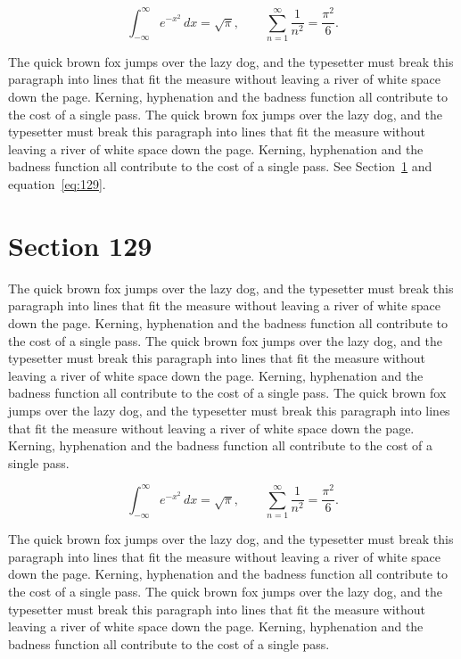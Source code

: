 \documentclass{article}
\begin{document}
\begin{equation}\label{eq:128}
\int_{-\infty}^{\infty} e^{-x^{2}}\,dx = \sqrt{\pi}, \qquad
\sum_{n=1}^{\infty} \frac{1}{n^{2}} = \frac{\pi^{2}}{6}.
\end{equation}

The quick brown fox jumps over the lazy dog, and the typesetter must break this paragraph into lines that fit the measure without leaving a river of white space down the page. Kerning, hyphenation and the badness function all contribute to the cost of a single pass. The quick brown fox jumps over the lazy dog, and the typesetter must break this paragraph into lines that fit the measure without leaving a river of white space down the page. Kerning, hyphenation and the badness function all contribute to the cost of a single pass. 
See Section~\ref{sec:129} and equation~\eqref{eq:129}.
\section{Section 129}
\label{sec:129}
The quick brown fox jumps over the lazy dog, and the typesetter must break this paragraph into lines that fit the measure without leaving a river of white space down the page. Kerning, hyphenation and the badness function all contribute to the cost of a single pass. The quick brown fox jumps over the lazy dog, and the typesetter must break this paragraph into lines that fit the measure without leaving a river of white space down the page. Kerning, hyphenation and the badness function all contribute to the cost of a single pass. The quick brown fox jumps over the lazy dog, and the typesetter must break this paragraph into lines that fit the measure without leaving a river of white space down the page. Kerning, hyphenation and the badness function all contribute to the cost of a single pass. 

\begin{equation}\label{eq:129}
\int_{-\infty}^{\infty} e^{-x^{2}}\,dx = \sqrt{\pi}, \qquad
\sum_{n=1}^{\infty} \frac{1}{n^{2}} = \frac{\pi^{2}}{6}.
\end{equation}

The quick brown fox jumps over the lazy dog, and the typesetter must break this paragraph into lines that fit the measure without leaving a river of white space down the page. Kerning, hyphenation and the badness function all contribute to the cost of a single pass. The quick brown fox jumps over the lazy dog, and the typesetter must break this paragraph into lines that fit the measure without leaving a river of white space down the page. Kerning, hyphenation and the badness function all contribute to the cost of a single pass. 
\end{document}
